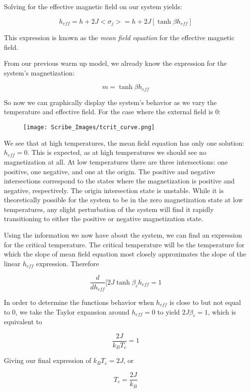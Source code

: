 \documentclass{article}
\newcommand{\bltz}{k_{B}}
\newcommand{\sigj}{\sigma_{j}}
\begin{document}
Solving for the effective magnetic field on our system yields:

$$h_{eff}=h+2J<\sigj>=h+2J[\tanh{\beta h_{eff}}]$$

This expression is known as the \textit{mean field equation} for the effective magnetic field.

From our previous warm up model, we already know the expression for the system's magnetization:

$$\boxed{m=\tanh{\beta h_{eff}}}$$  

So now we can graphically display the system's behavior as we vary the temperature and effective field.  For the case where the external field is 0:

\begin{figure}[h]
	\centering
	\texttt{[image: Scribe\_Images/tcrit\_curve.png]}
\end{figure}

We see that at high temperatures, the mean field equation has only one solution: $h_{eff}=0$.  This is expected, as at high temperatures we should see no magnetization at all.  At low temperatures there are three intersections: one positive, one negative, and one at the origin.  The positive and negative intersections correspond to the states where the magnetization is positive and negative, respectively.  The origin intersection state is unstable.  While it is theoretically possible for the system to be in the zero magnetization state at low temperatures, any slight perturbation of the system will find it rapidly transitioning to either the positive or negative magnetization state.  

Using the information we now have about the system, we can find an expression for the critical temperature.  The critical temperature will be the temperature for which the slope of mean field equation most closely approximates the slope of the linear $h_{eff}$ expression.  Therefore

$$\frac{d}{dh_{eff}}[2J\tanh{\beta_{c}h_{eff}}=1$$

In order to determine the functions behavior when $h_{eff}$ is close to but not equal to 0, we take the Taylor expansion around $h_{eff}=0$ to yield $2J\beta_{c}=1$, which is equivalent to 

$$\frac{2J}{\bltz T_{c}}=1$$

Giving our final expression of $\bltz T_{c}=2J$, or 

$$\boxed{T_{c}=\frac{2J}{\bltz}}$$
	

 



  
    
\end{document}
